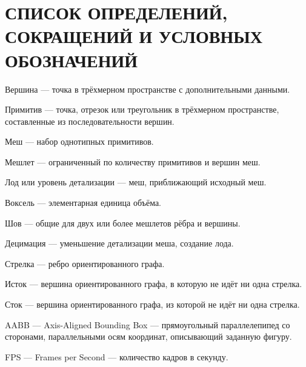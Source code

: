 \clearpage
\section{СПИСОК ОПРЕДЕЛЕНИЙ, СОКРАЩЕНИЙ И УСЛОВНЫХ ОБОЗНАЧЕНИЙ}

Вершина --- точка в трёхмерном пространстве с дополнительными данными.

Примитив --- точка, отрезок или треугольник в трёхмерном пространстве, составленные из последовательности вершин.

Меш --- набор однотипных примитивов.

Мешлет --- ограниченный по количеству примитивов и вершин меш.

Лод или уровень детализации --- меш, приближающий исходный меш.

Воксель --- элементарная единица объёма.

Шов --- общие для двух или более мешлетов рёбра и вершины.

Децимация --- уменьшение детализации меша, создание лода.

Стрелка --- ребро ориентированного графа.

Исток --- вершина ориентированного графа, в которую не идёт ни одна стрелка.

Сток --- вершина ориентированного графа, из которой не идёт ни одна стрелка.

AABB --- Axis-Aligned Bounding Box --- прямоугольный параллелепипед со сторонами, параллельными осям координат, описывающий заданную фигуру.

FPS --- Frames per Second --- количество кадров в секунду.
